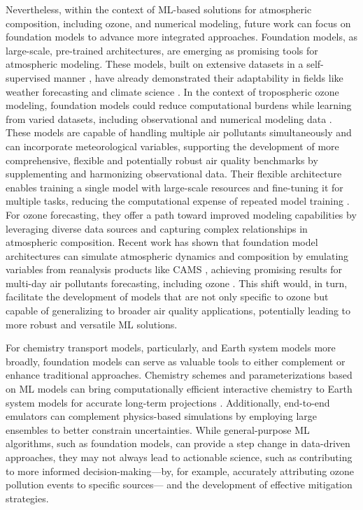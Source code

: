 \documentclass[gmd, manuscript]{copernicus}
\begin{document}
Nevertheless, within the context of ML-based solutions for atmospheric composition, including ozone, and numerical modeling, future work can focus on foundation models to advance more integrated approaches. Foundation models, as large-scale, pre-trained architectures, are emerging as promising tools for atmospheric modeling. These models, built on extensive datasets in a self-supervised manner , have already demonstrated their adaptability in fields like weather forecasting and climate science . In the context of tropospheric ozone modeling, foundation models could reduce computational burdens while learning from varied datasets, including observational and numerical modeling data . These models are capable of handling multiple air pollutants simultaneously and can incorporate meteorological variables, supporting the development of more comprehensive, flexible and potentially robust air quality benchmarks by supplementing and harmonizing observational data. Their flexible architecture enables training a single model with large-scale resources and fine-tuning it for multiple tasks, reducing the computational expense of repeated model training . For ozone forecasting, they offer a path toward improved modeling capabilities by leveraging diverse data sources and capturing complex relationships in atmospheric composition. Recent work has shown that foundation model architectures can simulate atmospheric dynamics and composition by emulating variables from reanalysis products like CAMS \citep{Inness}, achieving promising results for multi-day air pollutants forecasting, including ozone \citep{Bodnar2024}. This shift would, in turn, facilitate the development of models that are not only specific to ozone but capable of generalizing to broader air quality applications, potentially leading to more robust and versatile ML solutions. 

For chemistry transport models, particularly, and Earth system models more broadly, foundation models can serve as valuable tools to either complement or enhance traditional approaches. Chemistry schemes and parameterizations based on ML models can bring computationally efficient interactive chemistry to Earth system models for accurate long-term projections \citep{Eyring2016}. Additionally, end-to-end emulators can complement physics-based simulations by employing large ensembles to better constrain uncertainties. While general-purpose ML algorithms, such as foundation models, can provide a step change in data-driven approaches, they may not always lead to actionable science, such as contributing to more informed decision-making—by, for example, accurately attributing ozone pollution events to specific sources— and the development of effective mitigation strategies.
\end{document}
